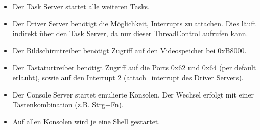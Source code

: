 \begin{itemize}
	\item Der Task Server startet alle weiteren Tasks.
	
	\item Der Driver Server benötigt die Möglichkeit, Interrupts zu attachen. Dies läuft indirekt über den Task Server, da nur dieser ThreadControl aufrufen kann.
	
	\item Der Bildschirmtreiber benötigt Zugriff auf den Videospeicher bei 0xB8000.
	
	\item Der Tastaturtreiber benötigt Zugriff auf die Ports 0x62 und 0x64 (per default erlaubt), sowie auf den Interrupt 2 (attach\_interrupt des Driver Servers).

	\item Der Console Server startet emulierte Konsolen. Der Wechsel erfolgt mit einer Tastenkombination (z.B. Strg+Fn).
	
	\item Auf allen Konsolen wird je eine Shell gestartet.
\end{itemize}